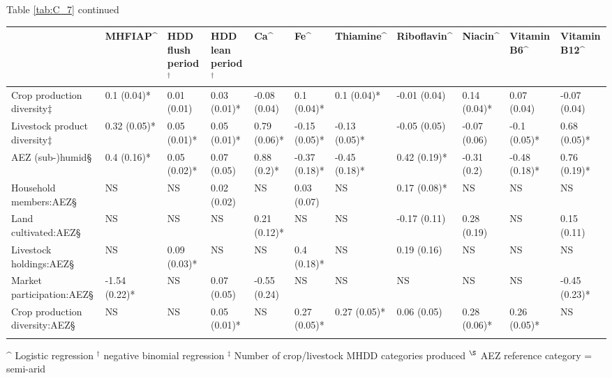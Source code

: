 \begin{table}
\small
\raggedright Table \ref{tab:C_7} continued
\label{tab:C_7_1}

\begin{tabularx}{\textwidth}{
p{}
p{}
p{}
p{}
p{}
p{}
p{}
p{}
p{}
p{}
p{}}
\toprule
 & MHFIAP\textasciicircum{} & HDD flush period$^{\dag}$ & HDD lean period$^{\dag}$ & Ca\textasciicircum{} & Fe\textasciicircum{} & Thiamine\textasciicircum{} & Riboflavin\textasciicircum{} & Niacin\textasciicircum{} & Vitamin B6\textasciicircum{} & Vitamin B12\textasciicircum{} \\
 \midrule
Crop production diversity${\ddag}$ & 0.1 (0.04)* & 0.01 (0.01) & 0.03 (0.01)* & -0.08 (0.04) & 0.1 (0.04)* & 0.1 (0.04)* & -0.01 (0.04) & 0.14 (0.04)* & 0.07 (0.04) & -0.07 (0.04) \\
Livestock product diversity${\ddag}$ & 0.32 (0.05)* & 0.05 (0.01)* & 0.05 (0.01)* & 0.79 (0.06)* & -0.15 (0.05)* & -0.13 (0.05)* & -0.05 (0.05) & -0.07 (0.06) & -0.1 (0.05)* & 0.68 (0.05)* \\
AEZ (sub-)humid{\S} & 0.4 (0.16)* & 0.05 (0.02)* & 0.07 (0.05) & 0.88 (0.2)* & -0.37 (0.18)* & -0.45 (0.18)* & 0.42 (0.19)* & -0.31 (0.2) & -0.48 (0.18)* & 0.76 (0.19)* \\
Household members:AEZ{\S} & NS & NS & 0.02 (0.02) & NS & 0.03 (0.07) & NS & 0.17 (0.08)* & NS & NS & NS \\
Land cultivated:AEZ{\S} & NS & NS & NS & 0.21 (0.12)* & NS & NS & -0.17 (0.11) & 0.28 (0.19) & NS & 0.15 (0.11) \\
Livestock holdings:AEZ{\S} & NS & 0.09 (0.03)* & NS & NS & 0.4 (0.18)* & NS & 0.19 (0.16) & NS & NS & NS \\
Market participation:AEZ{\S} & -1.54 (0.22)* & NS & 0.07 (0.05) & -0.55 (0.24) & NS & NS & NS & NS & NS & -0.45 (0.23)* \\
Crop production diversity:AEZ{\S} & NS & NS & 0.05 (0.01)* & NS & 0.27 (0.05)* & 0.27 (0.05)* & 0.06 (0.05) & 0.28 (0.06)* & 0.26 (0.05)* & NS \\
\arrayrulecolor{black}\bottomrule
\end{tabularx}
\footnotesize
\raggedright
\textasciicircum{} Logistic regression
$^{\dag}$ negative binomial regression
$^{\ddag}$ Number of crop/livestock MHDD categories produced
$^{\S}$ AEZ reference category = semi-arid
\end{table}


